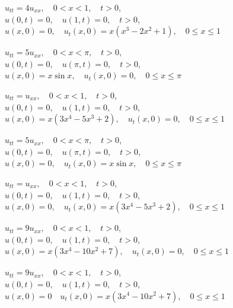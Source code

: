 \begin{exerciselist}
  \item\label{exer:12.2.9} $u_{tt}=4u_{xx},\quad0<x<1,\quad t>0$,\\ $u(0,t)=0,\quad u(1,t)=0,\quad t>0$,\\ $u(x,0)=0,\quad u_{t}(x,0)=x(x^{3}-2x^{2}+1),\quad0\le x\le1$

  \item\label{exer:12.2.10} $u_{tt}=5u_{xx},\quad0<x<\pi,\quad t>0$,\\ $u(0,t)=0,\quad u(\pi,t)=0,\quad t>0$,\\ $u(x,0)=x\sin x,\quad u_{t}(x,0)=0,\quad0\le x\le\pi$

  \item\label{exer:12.2.11} $u_{tt}=u_{xx},\quad0<x<1,\quad t>0$,\\ $u(0,t)=0,\quad u(1,t)=0,\quad t>0$,\\ $u(x,0)=x(3x^{4}-5x^{3}+2),\quad u_{t}(x,0)=0,\quad0\le x\le1$

  \item\label{exer:12.2.12} \Cex $u_{tt}=5u_{xx},\quad0<x<\pi,\quad t>0$,\\ $u(0,t)=0,\quad u(\pi,t)=0,\quad t>0$,\\ $u(x,0)=0,\quad u_{t}(x,0)=x\sin x,\quad0\le x\le\pi$

  \item\label{exer:12.2.13} $u_{tt}=u_{xx},\quad0<x<1,\quad t>0$,\\ $u(0,t)=0,\quad u(1,t)=0,\quad t>0$,\\ $u(x,0)=0,\quad u_{t}(x,0)=x(3x^{4}-5x^{3}+2),\quad0\le x\le1$

  \item\label{exer:12.2.14} $u_{tt}=9u_{xx},\quad0<x<1,\quad t>0$,\\ $u(0,t)=0,\quad u(1,t)=0,\quad t>0$,\\ $u(x,0)=x(3x^{4}-10x^{2}+7),\quad u_{t}(x,0)=0,\quad0\le x\le1$

  \item\label{exer:12.2.15} \Cex $u_{tt}=9u_{xx},\quad0<x<1,\quad t>0$,\\ $u(0,t)=0,\quad u(1,t)=0,\quad t>0$,\\ $u(x,0)=0\quad u_{t}(x,0)=x(3x^{4}-10x^{2}+7),\quad0\le x\le1$


\end{exerciselist}
